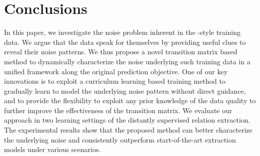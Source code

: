\vspace{-.4em}\section{Conclusions}
In this paper, we investigate the noise problem inherent in  the \DS-style training data.
 We argue that the data speak for themselves by providing useful clues to reveal their noise patterns.
We thus propose a novel transition matrix based method to dynamically characterize the noise underlying such training data in a unified framework along  the original prediction objective.
One of our key innovations is to exploit a curriculum learning based training method to gradually  learn to model  the underlying noise pattern without direct guidance, and to provide the flexibility to exploit any prior knowledge of the data quality to further improve the effectiveness of the transition matrix.
We evaluate our approach in two learning settings of the distantly supervised relation extraction. The experimental results show
that the proposed method can better characterize the underlying noise and consistently outperform start-of-the-art extraction models under various scenarios.

